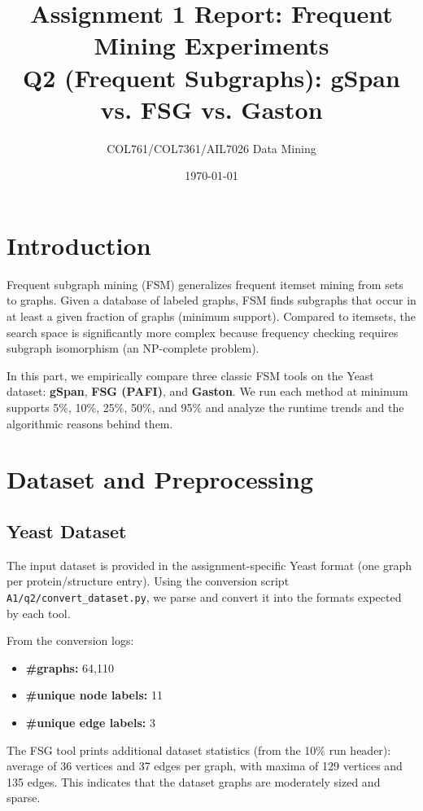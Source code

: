 \documentclass[11pt]{article}
\title{Assignment 1 Report: Frequent Mining Experiments\\
Q2 (Frequent Subgraphs): gSpan vs. FSG vs. Gaston}
\author{COL761/COL7361/AIL7026 Data Mining}
\date{\today}
\begin{document}
\sloppy

\maketitle

\section{Introduction}

Frequent subgraph mining (FSM) generalizes frequent itemset mining from sets to graphs.
Given a database of labeled graphs, FSM finds subgraphs that occur in at least a given fraction of graphs (minimum support).
Compared to itemsets, the search space is significantly more complex because frequency checking requires subgraph isomorphism (an NP-complete problem).

In this part, we empirically compare three classic FSM tools on the Yeast dataset:
\textbf{gSpan}, \textbf{FSG (PAFI)}, and \textbf{Gaston}.
We run each method at minimum supports 5\%, 10\%, 25\%, 50\%, and 95\% and analyze the runtime trends and the algorithmic reasons behind them.

\section{Dataset and Preprocessing}

\subsection{Yeast Dataset}

The input dataset is provided in the assignment-specific Yeast format (one graph per protein/structure entry). Using the conversion script \texttt{A1/q2/convert\_dataset.py}, we parse and convert it into the formats expected by each tool.

From the conversion logs:
\begin{itemize}
	\item \textbf{\#graphs:} 64,110
	\item \textbf{\#unique node labels:} 11
	\item \textbf{\#unique edge labels:} 3
\end{itemize}

The FSG tool prints additional dataset statistics (from the 10\% run header): average of 36 vertices and 37 edges per graph, with maxima of 129 vertices and 135 edges. This indicates that the dataset graphs are moderately sized and sparse.
\end{document}
